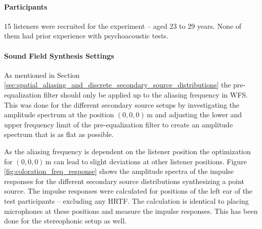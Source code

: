 \paragraph{Participants}
%
15 listeners were recruited for the experiment -- aged 23 to 29 years. None of
them had prior experience with psychoacoustic tests.

\paragraph{Sound Field Synthesis Settings}
%
As mentioned in
Section\,\ref{sec:spatial_aliasing_and_discrete_secondary_source_distributions}
the pre-equalization filter should only be applied up to the aliasing frequency
in \ac{WFS}. This was done for the different secondary source setups by investigating the
amplitude spectrum at the position $(0,0,0)$\,m and adjusting the lower and
upper frequency limit of the pre-equalization filter to create an amplitude
spectrum that is as flat as possible.
%
\begin{figure*}
    \small
    \centering
    
    \caption{Amplitude spectra for the varying secondary source distribution
    conditions. The spectra was simulated for the place of the left ear of
    the listener. The left graph shows the spectra
    for the central listening position, the right for the off-center one.
    The distance between the secondary sources is given for all \ac{WFS}
    spectra.
    The spectra are shifted in absolute magnitude in order to display
    them.
    Parameters: $\xs = (0,2.5,0)$, $\xref = (0,0,0)$\,m, circular secondary
    source distribution with a diameter of $3$\,m.
    }
    \label{fig:coloration_freq_response}
\end{figure*}
%
As the aliasing frequency is dependent on the listener position the optimization
for $(0,0,0)$\,m can lead to slight deviations at other listener positions.
Figure\,\ref{fig:coloration_freq_response} shows the amplitude spectra of the
impulse responses for the different secondary source distributions synthesizing
a point source. The impulse responses were calculated for positions of the left
ear of the test participants -- excluding any \ac{HRTF}.
The calculation is identical to placing microphones
at these positions and measure the impulse responses.
This has been done for the stereophonic setup as well.

